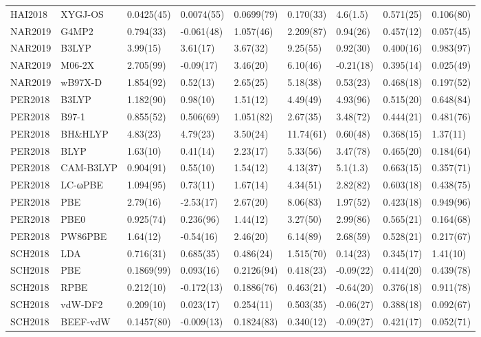 \begin{table}[ht]
\begin{tabular}{lllllllll}
  HAI2018 & XYGJ-OS & 0.0425(45) & 0.0074(55) & 0.0699(79) & 0.170(33) & 4.6(1.5) & 0.571(25) & 0.106(80) \\ 
  NAR2019 & G4MP2 & 0.794(33) & -0.061(48) & 1.057(46) & 2.209(87) & 0.94(26) & 0.457(12) & 0.057(45) \\ 
  NAR2019 & B3LYP & 3.99(15) & 3.61(17) & 3.67(32) & 9.25(55) & 0.92(30) & 0.400(16) & 0.983(97) \\ 
  NAR2019 & M06-2X & 2.705(99) & -0.09(17) & 3.46(20) & 6.10(46) & -0.21(18) & 0.395(14) & 0.025(49) \\ 
  NAR2019 & wB97X-D & 1.854(92) & 0.52(13) & 2.65(25) & 5.18(38) & 0.53(23) & 0.468(18) & 0.197(52) \\ 
  PER2018 & B3LYP & 1.182(90) & 0.98(10) & 1.51(12) & 4.49(49) & 4.93(96) & 0.515(20) & 0.648(84) \\ 
  PER2018 & B97-1 & 0.855(52) & 0.506(69) & 1.051(82) & 2.67(35) & 3.48(72) & 0.444(21) & 0.481(76) \\ 
  PER2018 & BH\&HLYP & 4.83(23) & 4.79(23) & 3.50(24) & 11.74(61) & 0.60(48) & 0.368(15) & 1.37(11) \\ 
  PER2018 & BLYP & 1.63(10) & 0.41(14) & 2.23(17) & 5.33(56) & 3.47(78) & 0.465(20) & 0.184(64) \\ 
  PER2018 & CAM-B3LYP & 0.904(91) & 0.55(10) & 1.54(12) & 4.13(37) & 5.1(1.3) & 0.663(15) & 0.357(71) \\ 
  PER2018 & LC-ωPBE & 1.094(95) & 0.73(11) & 1.67(14) & 4.34(51) & 2.82(82) & 0.603(18) & 0.438(75) \\ 
  PER2018 & PBE & 2.79(16) & -2.53(17) & 2.67(20) & 8.06(83) & 1.97(52) & 0.423(18) & 0.949(96) \\ 
  PER2018 & PBE0 & 0.925(74) & 0.236(96) & 1.44(12) & 3.27(50) & 2.99(86) & 0.565(21) & 0.164(68) \\ 
  PER2018 & PW86PBE & 1.64(12) & -0.54(16) & 2.46(20) & 6.14(89) & 2.68(59) & 0.528(21) & 0.217(67) \\ 
  SCH2018 & LDA & 0.716(31) & 0.685(35) & 0.486(24) & 1.515(70) & 0.14(23) & 0.345(17) & 1.41(10) \\ 
  SCH2018 & PBE & 0.1869(99) & 0.093(16) & 0.2126(94) & 0.418(23) & -0.09(22) & 0.414(20) & 0.439(78) \\ 
  SCH2018 & RPBE & 0.212(10) & -0.172(13) & 0.1886(76) & 0.463(21) & -0.64(20) & 0.376(18) & 0.911(78) \\ 
  SCH2018 & vdW-DF2 & 0.209(10) & 0.023(17) & 0.254(11) & 0.503(35) & -0.06(27) & 0.388(18) & 0.092(67) \\ 
  SCH2018 & BEEF-vdW & 0.1457(80) & -0.009(13) & 0.1824(83) & 0.340(12) & -0.09(27) & 0.421(17) & 0.052(71) \\ 

\end{tabular}
\end{table}
